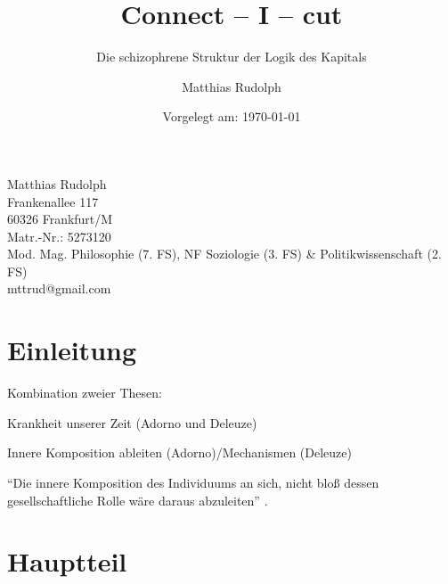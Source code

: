 \documentclass[12pt,
               DIV13,
               paper=a4,
               twoside=false,
               onehalfspacing,
               bibliography=totoc,
               toc=graduated,
               draft,
               ]{scrartcl}
\newcommand{\pc}[2]{\parencite[#1]{#2}}
\begin{document}
\setcounter{page}{0}

\titlehead{Goethe-Universität Frankfurt am Main\\
Fachbereich Philosophie und Geschichtswissenschaften\\
Institut für Philosophie\\
Prof. Dr. Christoph Menke\\
Seminar: Demokratie und Kapitalismus\\
SoSe 2013\\
Modul: VM 3b}
\title{Connect -- I -- cut}
\subtitle{Die schizophrene Struktur der Logik des Kapitals}
\author{Matthias Rudolph}
\date{Vorgelegt am: \today}

\maketitle
\vfill

\noindent Matthias Rudolph\\
Frankenallee 117\\
60326 Frankfurt/M\\
Matr.-Nr.: 5273120\\
Mod. Mag. Philosophie (7. FS), NF Soziologie (3. FS) \& Politikwissenschaft (2. FS)\\ %
mttrud@gmail.com
\newpage

\tableofcontents
\newpage


\section{Einleitung}

Kombination zweier Thesen:

Krankheit unserer Zeit (Adorno und Deleuze)

Innere Komposition ableiten (Adorno)/Mechanismen (Deleuze)

"`Die innere Komposition des Individuums an sich, nicht bloß dessen
gesellschaftliche Rolle wäre daraus abzuleiten"' \pc{261}{min}.


\section{Hauptteil}

\end{document}

